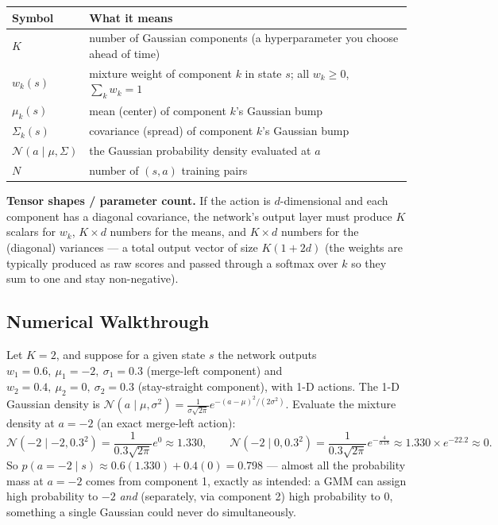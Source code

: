 \documentclass[11pt]{article}
\begin{document}
\begin{center}
\begin{tabular}{@{}ll@{}}
\toprule
Symbol & What it means \\
\midrule
$K$ & number of Gaussian components (a hyperparameter you choose ahead of time) \\
$w_k(s)$ & mixture weight of component $k$ in state $s$; all $w_k \ge 0$, $\sum_k w_k = 1$ \\
$\mu_k(s)$ & mean (center) of component $k$'s Gaussian bump \\
$\Sigma_k(s)$ & covariance (spread) of component $k$'s Gaussian bump \\
$\mathcal{N}(a \mid \mu,\Sigma)$ & the Gaussian probability density evaluated at $a$ \\
$N$ & number of $(s,a)$ training pairs \\
\bottomrule
\end{tabular}
\end{center}

\textbf{Tensor shapes / parameter count.} If the action is $d$-dimensional and each component has a diagonal covariance, the network's output layer must produce $K$ scalars for $w_k$, $K \times d$ numbers for the means, and $K \times d$ numbers for the (diagonal) variances --- a total output vector of size $K(1 + 2d)$ (the weights are typically produced as raw scores and passed through a softmax over $k$ so they sum to one and stay non-negative).

\subsection*{Numerical Walkthrough}

Let $K=2$, and suppose for a given state $s$ the network outputs $w_1 = 0.6,\ \mu_1=-2,\ \sigma_1=0.3$ (merge-left component) and $w_2=0.4,\ \mu_2=0,\ \sigma_2=0.3$ (stay-straight component), with 1-D actions. The 1-D Gaussian density is $\mathcal N(a\mid \mu,\sigma^2) = \frac{1}{\sigma\sqrt{2\pi}} e^{-(a-\mu)^2/(2\sigma^2)}$. Evaluate the mixture density at $a = -2$ (an exact merge-left action):
\[
\mathcal{N}(-2 \mid -2, 0.3^2) = \frac{1}{0.3\sqrt{2\pi}} e^{0} \approx 1.330, \qquad
\mathcal{N}(-2 \mid 0, 0.3^2) = \frac{1}{0.3\sqrt{2\pi}} e^{-\frac{4}{0.18}} \approx 1.330 \times e^{-22.2} \approx 0.
\]
So $p(a=-2 \mid s) \approx 0.6(1.330) + 0.4(0) = 0.798$ --- almost all the probability mass at $a=-2$ comes from component 1, exactly as intended: a GMM can assign high probability to $-2$ \emph{and} (separately, via component 2) high probability to $0$, something a single Gaussian could never do simultaneously.
\end{document}
